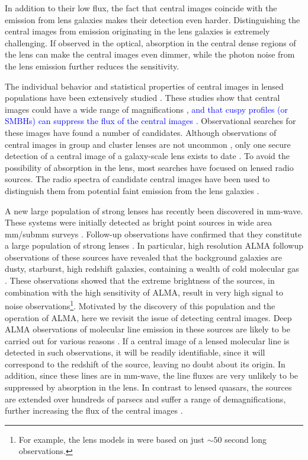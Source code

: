 \documentclass[chicago]{emulateapj}
\newcommand{\blue}{\textcolor{blue}}
\begin{document}
In addition to their low flux, the fact that central images coincide with the emission from lens galaxies makes their detection even harder. Distinguishing the central images from emission originating in the lens galaxies is extremely challenging.
If observed in the optical, absorption in the central dense regions of the lens can make the central images even dimmer, while the photon noise from the lens emission further reduces the sensitivity. 




The individual behavior and statistical properties of central images in lensed populations have been extensively studied \citep[e.g.,][]{Wallington:93, Mao:01, Evans:02, Keeton:03}. These studies show that central images could have a wide range of magnifications \citep[e.g.,][]{Keeton:03}, \blue{and that cuspy profiles (or SMBHs) can suppress the flux of the central images \citep[e.g.,][]{Bowman:04,Rusin:05,Mao:12}.}
Observational searches for these images have found a number of candidates. Although observations
of central images in group and cluster lenses are not uncommon \citep[e.g.,][]{Inada:08}, only one secure detection of a central image of a galaxy-scale lens exists to date \citep{Winn:04}. To avoid the possibility of absorption in the lens, most searches have focused on lensed radio sources. The radio spectra of candidate central images have been used to distinguish them from potential faint emission from the lens galaxies \citep[e.g.,][]{Zhang:07}.

A new large population of strong lenses has recently been discovered in mm-wave. These systems were initially detected as bright point sources in wide area mm/submm surveys \citep{vieira:10,negrello:10}. Follow-up observations have confirmed that they constitute a large population of strong lenses \citep{vieira:13, hezaveh:13b, bussmann:13}.
In particular, high resolution ALMA followup observations of these sources have revealed that the background galaxies are dusty, starburst, high redshift galaxies, containing a wealth of cold molecular gas \citep{Weiss:13}.  These observations showed that the extreme brightness of the sources, in combination with the high sensitivity of ALMA, result in very high signal to noise observations\footnote{For example, the lens models in \citet{hezaveh:13b} were based on just $\sim50$ second long observations.}.
Motivated by the discovery of this population and the operation of ALMA, here we revisit the issue of detecting central images.
Deep ALMA observations of molecular line emission in these sources are likely to be carried out for various reasons \citep[e.g.,][]{hezaveh:14a,hezaveh:14b}. If a central image of a lensed molecular line is detected in such observations, it will be readily identifiable, since it will correspond to the redshift of the source, leaving no doubt about its origin. In addition, since these lines are in mm-wave, the line fluxes are very unlikely to be suppressed by absorption in the lens. 
In contrast to lensed quasars, the sources are extended over hundreds of parsecs and suffer a range of demagnifications, further increasing the flux of the central images \citep[analogous to magnification damping of highly magnified images due to finite source effects, see e.g.,][]{hezaveh:11}.
\end{document}
